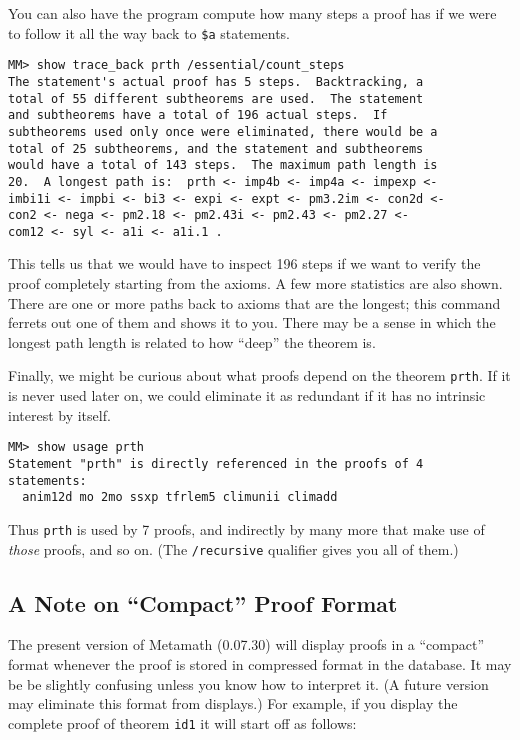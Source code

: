 You can also have the program compute how many steps a proof
has if we were to follow it all the way back to
\texttt{\$a} statements.

\begin{verbatim}
MM> show trace_back prth /essential/count_steps
The statement's actual proof has 5 steps.  Backtracking, a
total of 55 different subtheorems are used.  The statement
and subtheorems have a total of 196 actual steps.  If
subtheorems used only once were eliminated, there would be a
total of 25 subtheorems, and the statement and subtheorems
would have a total of 143 steps.  The maximum path length is
20.  A longest path is:  prth <- imp4b <- imp4a <- impexp <-
imbi1i <- impbi <- bi3 <- expi <- expt <- pm3.2im <- con2d <-
con2 <- nega <- pm2.18 <- pm2.43i <- pm2.43 <- pm2.27 <-
com12 <- syl <- a1i <- a1i.1 .
\end{verbatim}

This tells us that we would have to inspect 196 steps if we want to
verify the proof completely starting from the axioms.  A few more
statistics are also shown.  There are one or more paths back to axioms
that are the longest; this command ferrets out one of them and shows it
to you.  There may be a sense in which the longest path length is
related to how ``deep'' the theorem is.

Finally, we might be curious about what proofs depend on the theorem
\texttt{prth}.  If it is never used later on, we could eliminate it as
redundant if it has no intrinsic interest by itself.

\begin{verbatim}
MM> show usage prth
Statement "prth" is directly referenced in the proofs of 4
statements:
  anim12d mo 2mo ssxp tfrlem5 climunii climadd
\end{verbatim}

Thus \texttt{prth} is used by 7 proofs, and indirectly by many more that
make use of {\em those} proofs, and so on.  (The \texttt{/recursive}
qualifier gives you all of them.)

\subsection{A Note on ``Compact'' Proof Format}

The present version of Metamath (0.07.30) will display proofs in a ``compact''
format whenever the proof is stored in compressed format in the database.  It
may be be slightly confusing unless you know how to interpret it.  (A
future version may eliminate this format from displays.)  For example,
if you display the complete proof of theorem \texttt{id1} it will start
off as follows:

